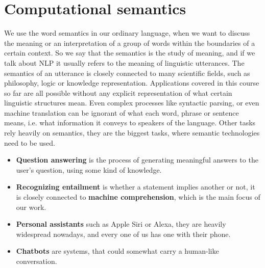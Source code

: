 \section{Computational semantics}
We use the word semantics in our ordinary language, when we want to discuss the meaning or an interpretation of a group of words within the boundaries of a certain context.
So we say that the semantics is the study of meaning, and if we talk about NLP it usually refers to the meaning of linguistic utterances.
The semantics of an utterance is closely connected to many scientific fields, such as philosophy, logic or knowledge representation.
Applications covered in this course so far are all possible without any explicit representation of what certain linguistic structures mean.
Even complex processes like syntactic parsing, or even machine translation can be ignorant of what each word, phrase or sentence means, i.e. what information it conveys to speakers of the language.
Other tasks rely heavily on semantics, they are the biggest tasks, where semantic technologies need to be used.
\begin{itemize}
  \item \textbf{Question answering} is the process of generating meaningful answers to the user's question, using some kind of knowledge.
  \item \textbf{Recognizing entailment} is whether a statement implies another or not, it is closely connected to \textbf{machine comprehension}, which is the main focus of our work.
  \item \textbf{Personal assistants} such as Apple Siri or Alexa, they are heavily widespread nowadays, and every one of us has one with their phone.
  \item \textbf{Chatbots} are systems, that could somewhat carry a human-like conversation.
\end{itemize}



